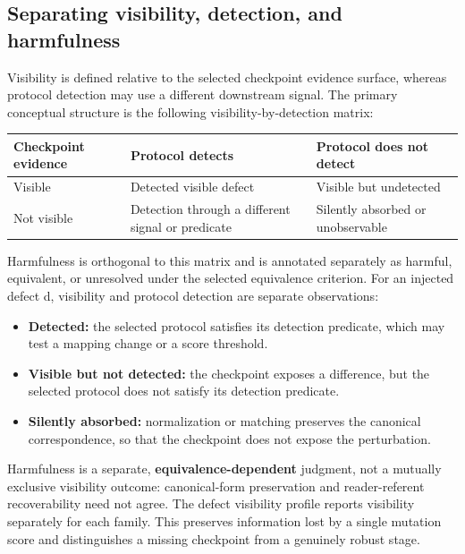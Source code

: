 \documentclass[10pt]{article}
\begin{document}
\subsection{Separating visibility, detection, and harmfulness}
Visibility is defined relative to the selected checkpoint evidence surface, whereas protocol detection may use a different downstream signal.
The primary conceptual structure is the following visibility-by-detection matrix:
\begin{table}[t]
\centering
\small
\setlength{\tabcolsep}{3pt}
\begin{tabular}{>{\raggedright\arraybackslash}p{}>{\raggedright\arraybackslash}p{}>{\raggedright\arraybackslash}p{}}
\hline
Checkpoint evidence & Protocol detects & Protocol does not detect \\
\hline
Visible & Detected visible defect & Visible but undetected \\
Not visible & Detection through a different signal or predicate & Silently absorbed or unobservable \\
\hline
\end{tabular}
\end{table}
Harmfulness is orthogonal to this matrix and is annotated separately as harmful, equivalent, or unresolved under the selected equivalence criterion.
For an injected defect d, visibility and protocol detection are separate observations:
\begin{itemize}
\item \textbf{Detected:} the selected protocol satisfies its detection predicate, which may test a mapping change or a score threshold.
\item \textbf{Visible but not detected:} the checkpoint exposes a difference, but the selected protocol does not satisfy its detection predicate.
\item \textbf{Silently absorbed:} normalization or matching preserves the canonical correspondence, so that the checkpoint does not expose the perturbation.
\end{itemize}
Harmfulness is a separate, \textbf{equivalence-dependent} judgment, not a mutually exclusive visibility outcome: canonical-form preservation and reader-referent recoverability need not agree.
The defect visibility profile reports visibility separately for each family. This preserves information lost by a single mutation score and distinguishes a missing checkpoint from a genuinely robust stage.
\end{document}
